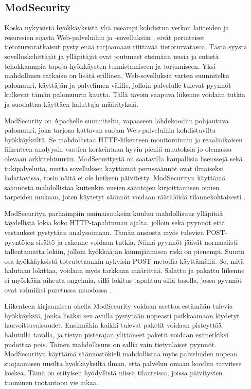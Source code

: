 \subsection{ModSecurity}

Koska nykyisistä hyökkäyksistä yhä useampi kohdistuu verkon laitteiden ja resurssien sijasta Web-palveluihin ja -sovelluksiin \cite{WASCb} \cite{SYM}, eivät perinteiset
tietoturvaratkaisut pysty enää tarjoamaan riittävää tietoturvatasoa. Tästä syystä sovelluskehittäjät ja ylläpitäjät ovat joutuneet etsimään uusia ja entistä tehokkaampia 
tapoja hyökkäysten tunnistamiseen ja torjumiseen. Yksi mahdollinen ratkaisu on lisätä erillinen, Web-sovelluksia varten suunniteltu palomuuri, käyttäjän ja palvelimen 
välille, jolloin palvelulle tulevat pyynnöt kulkevat tämän palomuurin kautta. Tällä tavoin saapuva liikenne voidaan tutkia ja suodattaa käyttäen haluttuja määrityksiä. 

ModSecurity \cite{Mod} on Apachelle suunniteltu, vapaaseen lähdekoodiin pohjautuva palomuuri, joka tarjoaa kattavan suojan Web-palveluihin kohdistuvilta hyökkäyksiltä. 
Se mahdollistaa HTTP-liikenteen monitoroinnin ja reaaliaikaisen liikenteen analyysin vaatien korkeintaan hyvin pieniä muutoksia jo olemassa olevaan arkkitehtuuriin.
ModSecuritystä on saatavilla kaupallisia lisenssejä sekä tukipalveluita, mutta sovelluksen käyttämät perussäännöt ovat ilmaiseksi ladattavissa, tosin näitä
ei ole hetkeen päivitetty. ModSecurityn käyttämä säännöstä mahdollistaa kuitenkin uusien sääntöjen kirjoittamisen omien tarpeiden mukaan, joten käytetyt säännöt voidaan räätälöidä 
tilannekohtaisesti \cite{Mod}. 

ModSecurityn parhaimpiin ominaisuuksiin kuuluu mahdollisuus ylläpitää täydellistä lokia koko HTTP-tapahtuman ajalta, jolloin sekä pyynnöt että vastaukset pystytään analysoimaan.
Tämän ansiosta myös tulevien POST-pyyntöjen sisältö ja rakenne voidaan
tutkia. Nämä pyynnöt jäävät normaalisti tallentamatta lokiin, jolloin
hyökkääjän kiinnijäämisen riski on pienempi. Suurin osa hyökkäyksistä toteutetaankin 
nykyisin POST-metodia käyttämällä. Se, mitä halutaan lokittaa, voidaan myös tarkkaan määrittää. Salattu ja pakattu liikenne ei myöskään aiheuta ongelmia, sillä lokitus tapahtuu sillä tasolla,
jossa pyynnöt ovat valmiiksi puretussa muodossa \cite{Mod}.

Liikenteen kirjaamisen ohella ModSecurity voidaan asettaa estämään tulevia hyökkäyksiä, jonka lisäksi sen avulla pystytään nopeasti paikkaamaan löydetyt haavoittuvaisuudet. 
Ensinnäkin kaikki tulevat paketit voidaan pisteyttää halutulla tavalla, ja tietyn pisterajan ylittäneet paketit voidaan esimerkiksi pudottaa pois. Toinen mahdollisuus on sallia vain 
tietynlaiset pyynnöt. ModSecurityn käyttämä säännöstökieli mahdollistaa myös palveluiden nopean suojaamisen uusilta hyökkäyksiltä ilman, että palvelun omaan koodiin tarvitsee koskea.
Tämä on erityisen hyödyllistä niissä tilanteissa, joissa päivitysten tuominen tuotantoon vie aikaa. 
